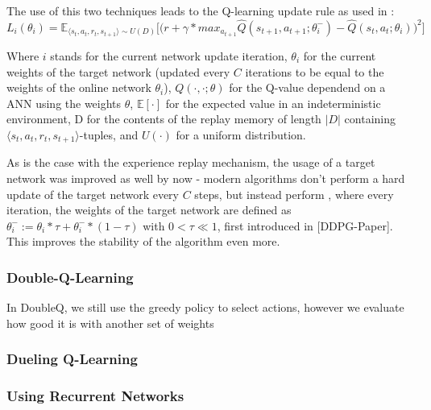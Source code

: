 The use of this two techniques leads to the Q-learning update rule as used in \cite{mnih_human-level_2015}:
\begin{equation}
	L_i(\theta_i) = \mathds{E}_{\langle s_t,a_t,r_t,s_{t+1} \rangle \sim U(D)} \Bigg[\Big( r + \gamma * max_{a_{t+1}} \hat{Q}(s_{t+1}, a_{t+1}; \theta^-_i) - \hat{Q}(s_t,a_t;\theta_i) \Big)^2\Bigg]
\end{equation}
\begin{flushright}
	\scriptsize
	Where $i$ stands for the current network update iteration, $\theta_i$ for the current weights of the target network (updated every $C$ iterations to be equal to the weights of the online network $\theta_i$), $Q(\cdot,\cdot;\theta)$ for the Q-value dependend on a ANN using the weights $\theta$, $\mathds{E}[\cdot]$ for the expected value in an indeterministic environment, D for the contents of the replay memory of length $\lvert D \rvert$ containing $\langle s_t,a_t,r_t,s_{t+1} \rangle$-tuples, and $U(\cdot)$ for a uniform distribution.
\end{flushright}
As is the case with the experience replay mechanism, the usage of a target network was improved as well by now - modern algorithms don't perform a hard update of the target network every $C$ steps, but instead perform , where every iteration, the weights of the target network are defined as $\theta^-_i := \theta_i * \tau + \theta^-_i * (1-\tau)$ with $0 < \tau \ll 1$, first introduced in [DDPG-Paper]. This improves the stability of the algorithm even more.\\


\subsubsection{Double-Q-Learning}
In DoubleQ, we still use the greedy policy to select actions, however we evaluate how good it is with another set of weights


\subsubsection{Dueling Q-Learning}

\subsubsection{Using Recurrent Networks}

